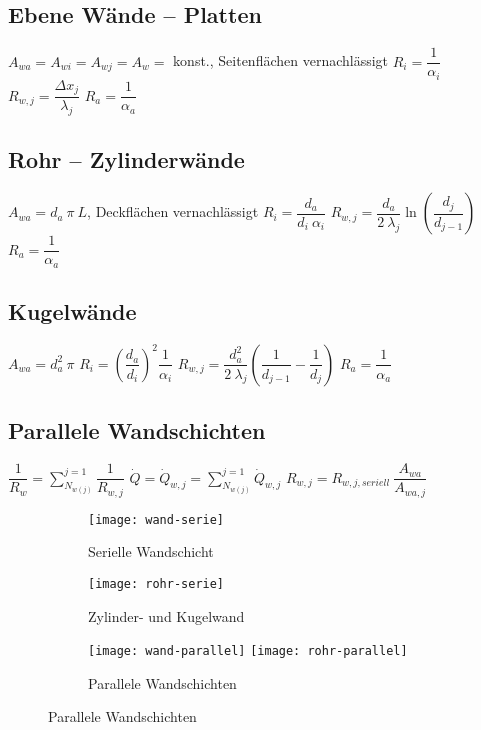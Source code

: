 \subsection{Ebene Wände -- Platten}
	$ A_{wa} = A_{wi} = A_{wj} = A_{w} = $ konst., Seitenflächen vernachlässigt
		\quad $ R_i = \dfrac{1}{\alpha_i} $
		\quad $ R_{w,j} = \dfrac{\Delta x_j}{\lambda_j} $
		\quad $ R_a = \dfrac{1}{\alpha_a} $

\subsection{Rohr -- Zylinderwände}
	$ A_{wa} = d_a\ \pi\ L $, Deckflächen vernachlässigt
		\qquad $ R_i = \dfrac{d_a}{d_i\ \alpha_i}     $
		\qquad $ R_{w,j} = \dfrac{d_a}{2\ \lambda_j}  \ln\left( \dfrac{d_j}{d_{j-1}} \right) $
		\qquad $ R_a = \dfrac{1}{\alpha_a} $

\subsection{Kugelwände}
	$ A_{wa} = d_a^2\ \pi $
		\qquad $ R_i = \left(\dfrac{d_a}{d_i}\right)^2 \dfrac{1}{\alpha_i} $
		\qquad $ R_{w,j} = \dfrac{d_a^2}{2\ \lambda_j} \left(\dfrac{1}{d_{j-1}} - \dfrac{1}{d_{j}}\right) $
		\qquad $ R_a = \dfrac{1}{\alpha_a} $

\subsection{Parallele Wandschichten}
	$ \dfrac{1}{R_w} = \displaystyle\sum_{N_{w(j)}}^{j=1}   \dfrac{1}{R_{w,j}} $
		\qquad $ \dot{Q} = \dot{Q}_{w,j} =  \displaystyle\sum_{N_{w(j)}}^{j=1}   \dot{Q}_{w,j}$
		\qquad $ R_{w,j} = R_{w,j,seriell}\ \dfrac{A_{wa}}{A_{wa,j}} $

\begin{figure}[h]
	\centering
	\begin{subfigure}{0.24\textwidth}
		\centering
		\texttt{[image: wand-serie]}
		\caption{Serielle Wandschicht}
	\end{subfigure}
	\begin{subfigure}{0.28\textwidth}
		\centering
		\texttt{[image: rohr-serie]}
		\caption{Zylinder- und Kugelwand}
	\end{subfigure}
	\begin{subfigure}{0.45\textwidth}
		\centering
		\texttt{[image: wand-parallel]}
		\texttt{[image: rohr-parallel]}
		\caption{Parallele Wandschichten}
	\end{subfigure}
\end{figure}

